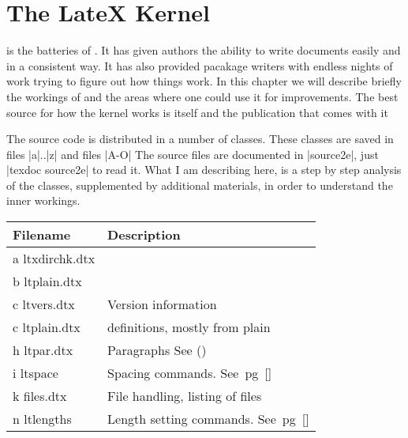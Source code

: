 \chapter{The LateX Kernel}

\begin{multicols}{2}
\latex is the batteries of \tex. It has given authors the ability to write documents easily and in a consistent way. It has also provided pacakage writers with endless nights of work trying to figure out how things work. In this chapter we will describe briefly the workings of \latex and the areas where one could use it for improvements. The best source for how the \latex kernel works is \latex itself and the publication that comes with it 

 The \latex source code is distributed in a number of classes. These classes are saved in files |a|..|z| and files |A-O| The source files are documented in |source2e|, just |texdoc source2e| to read it. What I am describing here, is a step by step analysis of the classes, supplemented by additional materials, in order to understand the inner workings. 
\end{multicols}

{\RaggedRight
\begin{tabular}{lp{5cm}}
\toprule
Filename  &Description \\
\midrule
a ltxdirchk.dtx &        \\
b ltplain.dtx    &        \\
c ltvers.dtx     & Version information       \\
c ltplain.dtx    & definitions, mostly from plain\\
h ltpar.dtx      & Paragraphs See (\pageref{pars})\\
i  ltspace        &Spacing commands. See~pg~[\pageref{spc}]\\
k files.dtx       & File handling, listing of files\\
n ltlengths      & Length setting commands. See~pg~[\pageref{kernel:lengths}]\\
\bottomrule
\end{tabular}
}


%


